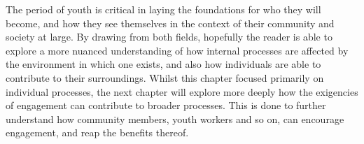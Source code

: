 The period of youth is critical in laying the foundations for who they will become, and how they see themselves in the context of their community and society at large. By drawing from both fields, hopefully the reader is able to explore a more nuanced understanding of how internal processes are affected by the environment in which one exists, and also how individuals are able to contribute to their surroundings. Whilst this chapter focused primarily on individual processes, the next chapter will explore more deeply how the exigencies of engagement can contribute to broader processes. This is done to further understand how community members, youth workers and so on, can encourage engagement, and reap the benefits thereof. 


